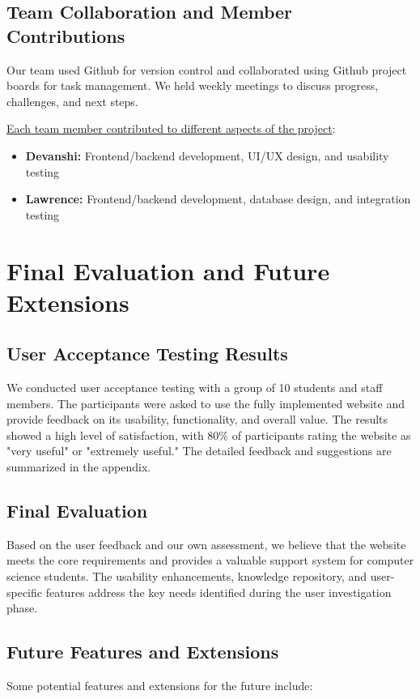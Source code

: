 \documentclass[12pt]{article}
\begin{document}
\subsection{Team Collaboration and Member Contributions}
Our team used Github for version control and collaborated using Github project boards for task management. We held weekly meetings to discuss progress, challenges, and next steps. 

\bigskip
\noindent \underline{Each team member contributed to different aspects of the project}:

\begin{itemize}
    \item \textbf{ Devanshi:} Frontend/backend development, UI/UX design, and usability testing
    \item \textbf{ Lawrence:} Frontend/backend development, database design, and integration testing
\end{itemize}

\newpage
\section{Final Evaluation and Future Extensions}
\subsection{User Acceptance Testing Results}
We conducted user acceptance testing with a group of 10 students and staff members. The participants were asked to use the fully implemented website and provide feedback on its usability, functionality, and overall value. The results showed a high level of satisfaction, with 80\% of participants rating the website as "very useful" or "extremely useful." The detailed feedback and suggestions are summarized in the appendix.

\subsection{Final Evaluation}
Based on the user feedback and our own assessment, we believe that the website meets the core requirements and provides a valuable support system for computer science students. The usability enhancements, knowledge repository, and user-specific features address the key needs identified during the user investigation phase.

\subsection{Future Features and Extensions}
Some potential features and extensions for the future include:
\end{document}
